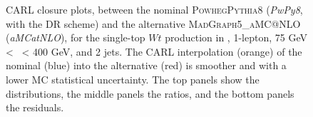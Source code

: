 \begin{figure}[!htbp]
    \centering
      \caption{CARL closure plots, between the nominal \textsc{Powheg}\textsc{Pythia}8 (\textit{PwPy8}, with the DR scheme) and the alternative \textsc{MadGraph5\_aMC@NLO} (\textit{aMCatNLO}), for the single-top $Wt$ production in \vhb, 1-lepton, 75 GeV < \ptv\ < 400 GeV, and 2 jets. The CARL interpolation (orange) of the nominal (blue) into the alternative (red) is smoother and with a lower MC statistical uncertainty. The top panels show the distributions, the middle panels the ratios, and the bottom panels the residuals.}
      \label{fig:carl:resolved_closure_stopWt}
  \end{figure}
  

